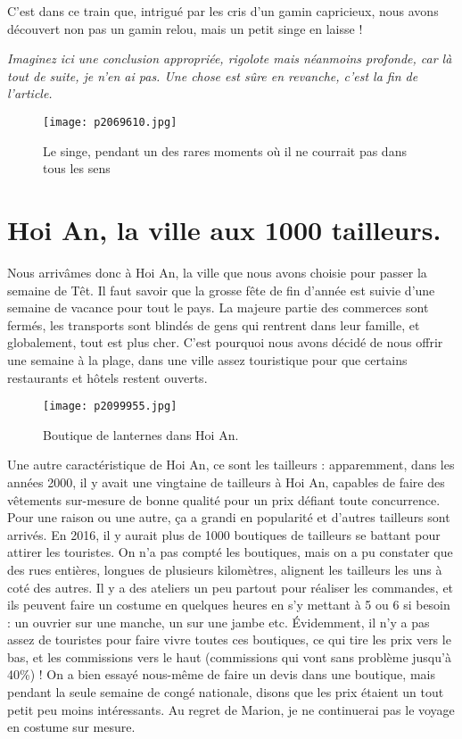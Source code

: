 \documentclass{book}
\begin{document}
C'est dans ce train que, intrigué par les cris d'un gamin capricieux, nous avons découvert non pas un gamin relou, mais un petit singe en laisse !

\emph{Imaginez ici une conclusion appropriée, rigolote mais néanmoins profonde, car là tout de suite, je n'en ai pas. Une chose est sûre en revanche, c'est la fin de l'article.}


\begin{figure}[h]
\centering
\texttt{[image: p2069610.jpg]}
\caption*{Le singe, pendant un des rares moments où il ne courrait pas dans tous les sens}
\end{figure}



\chapter{Hoi An, la ville aux 1000 tailleurs.}
Nous arrivâmes donc à Hoi An, la ville que nous avons choisie pour passer la semaine de Têt. Il faut savoir que la grosse fête de fin d'année est suivie d'une semaine de vacance pour tout le pays. La majeure partie des commerces sont fermés, les transports sont blindés de gens qui rentrent dans leur famille, et globalement, tout est plus cher. C'est pourquoi nous avons décidé de nous offrir une semaine à la plage, dans une ville assez touristique pour que certains restaurants et hôtels restent ouverts.


\begin{figure}[h]
\centering
\texttt{[image: p2099955.jpg]}
\caption*{Boutique de lanternes dans Hoi An.}
\end{figure}


Une autre caractéristique de Hoi An, ce sont les tailleurs : apparemment, dans les années 2000, il y avait une vingtaine de tailleurs à Hoi An, capables de faire des vêtements sur-mesure de bonne qualité pour un prix défiant toute concurrence. Pour une raison ou une autre, ça a grandi en popularité et d'autres tailleurs sont arrivés. En 2016, il y aurait plus de 1000 boutiques de tailleurs se battant pour attirer les touristes. On n'a pas compté les boutiques, mais on a pu constater que des rues entières, longues de plusieurs kilomètres, alignent les tailleurs les uns à coté des autres. Il y a des ateliers un peu partout pour réaliser les commandes, et ils peuvent faire un costume en quelques heures en s'y mettant à 5 ou 6 si besoin : un ouvrier sur une manche, un sur une jambe etc. Évidemment, il n'y a pas assez de touristes pour faire vivre toutes ces boutiques, ce qui tire les prix vers le bas, et les commissions vers le haut (commissions qui vont sans problème jusqu'à 40\%) ! On a bien essayé nous-même de faire un devis dans une boutique, mais pendant la seule semaine de congé nationale, disons que les prix étaient un tout petit peu moins intéressants. Au regret de Marion, je ne continuerai pas le voyage en costume sur mesure.
\end{document}
